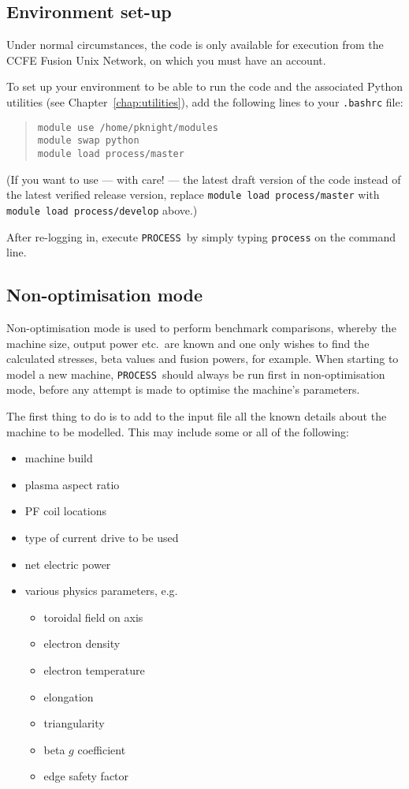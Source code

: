\documentclass[11pt,a4paper]{report}
\newcommand{\process}{\mbox{\texttt{PROCESS}}}
\begin{document}
\subsection{Environment set-up}
\label{sec:run_environment}

Under normal circumstances, the code is only available for execution from the
CCFE Fusion Unix Network, on which you must have an account.

To set up your environment to be able to run the code and the associated
Python utilities (see Chapter~\ref{chap:utilities}), add the following lines
to your \texttt{.bashrc} file:
\begin{quote}
\begin{verbatim}
module use /home/pknight/modules
module swap python
module load process/master
\end{verbatim}
\end{quote}
(If you want to use --- with care! --- the latest draft version of the code
instead of the latest verified release version, replace \texttt{module load
  process/master} with \texttt{module load process/develop} above.)

After re-logging in, execute \process\ by simply typing \texttt{process} on
the command line.

\subsection{Non-optimisation mode}

Non-optimisation mode is used to perform benchmark comparisons, whereby the
machine size, output power etc.\ are known and one only wishes to find the
calculated stresses, beta values and fusion powers, for example. When starting
to model a new machine, \process\ should always be run first in non-optimisation
mode, before any attempt is made to optimise the machine's parameters.

The first thing to do is to add to the input file all the known details about
the machine to be modelled. This may include some or all of the following:
\begin{itemize}
\item machine build
\item plasma aspect ratio
\item PF coil locations
\item type of current drive to be used
\item net electric power
\item various physics parameters, e.g.
\begin{itemize}
\item toroidal field on axis
\item electron density
\item electron temperature
\item elongation
\item triangularity
\item beta $g$ coefficient
\item edge safety factor
\end{itemize}
\end{itemize}
\end{document}
